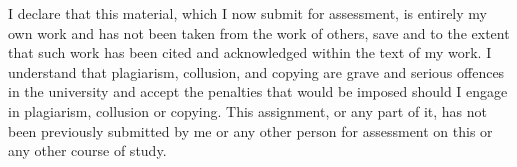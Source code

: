 I declare that this material, which I now submit for assessment, 
is entirely my own work and has not been taken from the work of others, 
save and to the extent that such work has been cited and acknowledged within 
the text of my work. I understand that plagiarism, collusion, and copying 
are grave and serious offences in the university and accept the penalties that 
would be imposed should I engage in plagiarism, collusion or copying. 
This assignment, or any part of it, has not been previously submitted by 
me or any other person for assessment on this or any other course of study.